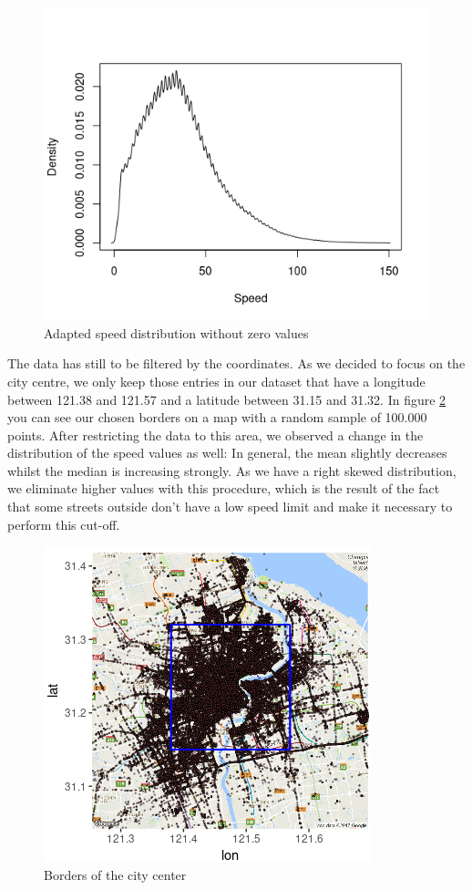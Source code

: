 \documentclass[11pt,conference,a4paper,twocolumns,romanappendices]{IEEEtran}
\begin{document}
\begin{figure}[h]
\centering
\includegraphics[scale=0.65]{speed.png}
\caption{\label{fig:speed}Adapted speed distribution without zero values}
\end{figure}

The data has still to be filtered by the coordinates. As we decided to focus on the city centre, we only keep those entries in our dataset that have a longitude between 121.38 and 121.57 and a latitude between 31.15 and 31.32. In figure \ref{fig:borders} you can see our chosen borders on a map with a random sample of 100.000 points.  After restricting the data to this area, we observed a change in the distribution of the speed values as well: In general, the mean slightly decreases whilst the median is increasing strongly. As we have a right skewed distribution, we eliminate higher values with this procedure, which is the result of the fact that some streets outside don't have a low speed limit and make it necessary to perform this cut-off. \\
\begin{figure}[h]
\centering
\includegraphics[scale=0.9]{borders.png}
\caption{\label{fig:borders}Borders of the city center}
\end{figure}
\end{document}
